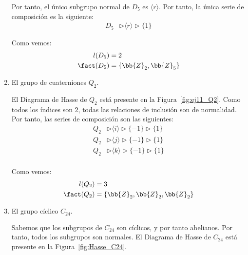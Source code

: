 \begin{ejercicio}
\begin{enumerate}
        Por tanto, el único subgrupo normal de $D_5$ es $\langle r\rangle$. Por tanto, la única serie de composición es la siguiente:
        \begin{align*}
            D_5 &\rhd \langle r \rangle \rhd \{1\}
        \end{align*}

        Como vemos:
        \begin{align*}
            l(D_5) &= 2 \\
            \fact(D_5) &= \{\bb{Z}_2, \bb{Z}_5\}
        \end{align*}
        \item El grupo de cuaterniones $Q_2$.
        
        El Diagrama de Hasse de $Q_2$ está presente en la Figura~\ref{fig:ej11_Q2}. Como todos los índices son $2$, todas las relaciones de inclusión son de normalidad. Por tanto, las series de composición son las siguientes:
        \begin{align*}
            Q_2 &\rhd \langle i \rangle \rhd \{-1\} \rhd \{1\} \\
            Q_2 &\rhd \langle j \rangle \rhd \{-1\} \rhd \{1\} \\
            Q_2 &\rhd \langle k \rangle \rhd \{-1\} \rhd \{1\} \\
        \end{align*}

        Como vemos:
        \begin{align*}
            l(Q_2) &= 3 \\
            \fact(Q_2) &= \{\bb{Z}_2, \bb{Z}_2, \bb{Z}_2\}
        \end{align*}
        \item El grupo cíclico $C_{24}$.
        
        Sabemos que los subgrupos de $C_{24}$ son cíclicos, y por tanto abelianos. Por tanto, todos los subgrupos son normales. El Diagrama de Hasse de $C_{24}$ está presente en la Figura~\ref{fig:Hasse_C24}.
        \begin{figure}
            \centering
\end{figure}
\end{enumerate}
\end{ejercicio}
